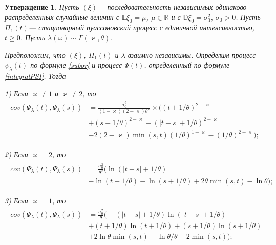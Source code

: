 \documentclass[a4paper,12pt]{article}
\numberwithin{equation}{section}
\newcommand{\R}{\mathbb R}
\newtheorem{Proposition}{Утверждение}
\begin{document}
	\begin{Proposition}
		Пусть $(\xi)$--- последовательность независимых одинаково распределенных случайные величин с $\mathbb{E}\xi_0 = \mu$, $\mu \in \R$ и с $\mathbb{D}\xi_0 = \sigma_0^2$, $\sigma_0>0$. Пусть $\Pi_1(t)$--- стационарный пуассоновский процесс с единичной интенсивностью, $t \geq 0$. Пусть $\lambda(\omega) \sim \Gamma(\varkappa, \theta)$. 
		
		Предположим, что $(\xi)$, $\Pi_1(t)$ и $\lambda$ взаимно независимы. Определим процесс $\psi_{\lambda}(t)$ по формуле \eqref{subor} и процесс $\Psi(t)$, определенный по формуле \eqref{integralPSI}. Тогда 
		
		1) Если $\varkappa \ne 1$ и $\varkappa \ne 2$, то 
		\begin{align}
		\begin{split}
		cov(\Psi_{\lambda}(t), \Psi_{\lambda}(s)) &= \frac{\sigma_0^2}{(1-\varkappa)(2-\varkappa)\theta^{\varkappa}}\times \biggr( (t+1/\theta)^{2-\varkappa} \\ &+ (s+1/\theta)^{2-\varkappa} -(|t-s| +  1/\theta)^{2-\varkappa}\\ &-2(2-\varkappa)\min(s,t )(1/\theta)^{1-\varkappa}-(1/\theta)^{2-\varkappa}\biggr);
		\end{split}
		\end{align}
		
		2) Если $\varkappa = 2$, то 
		\begin{align}
		\begin{split}
		cov(\Psi_{\lambda}(t), \Psi_{\lambda}(s)) &= \frac{\sigma_0^2}{\theta^2} \biggr( \ln(|t-s|+1/\theta) \\ &- \ln(t+1/\theta)- \ln(s+1/\theta)+2\theta\min(s,t)-\ln \theta \biggr);
		\end{split}
		\end{align}
		
		3) Если $\varkappa = 1$, то 
		\begin{align}
		\begin{split}
		cov(\Psi_{\lambda}(t), \Psi_{\lambda}(s)) &= \frac{\sigma_0^2}{\theta} \biggr( -(|t-s|+1/\theta)\ln(|t-s|+1/\theta) \\ &+ (t+1/\theta)\ln(t+1/\theta)+ (s+1/\theta)\ln(s+1/\theta) \\ &+ 2\ln \theta \min(s,t) +\ln \theta/\theta -2\min(s,t)  \biggr);
		\end{split}
		\end{align}
	\end{Proposition}
\end{document}
